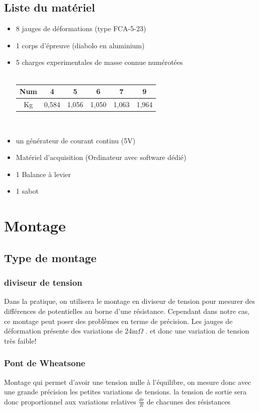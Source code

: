 \documentclass[10pt,a4paper]{report}
\begin{document}
\section{Liste du matériel}
\begin{itemize}
\item 8 jauges de déformations (type FCA-5-23)
\item 1 corps d'épreuve (diabolo en aluminium)
\item 5 charges experimentales de masse connue numérotées ~\\~\\
\begin{tabular}{|c|c|c|c|c|c|}
\hline 
Num & 4 & 5 & 6 & 7 & 9 \\ \hline
Kg    & 0,584 & 1,056 & 1,050 & 1,063 & 1,964 \\ \hline
\end{tabular}~\\
\item un générateur de courant continu (5V)
\item Matériel d'acquisition (Ordinateur avec software dédié)
\item 1 Balance à levier
\item 1 sabot
\end{itemize}
\chapter{Montage}
\section{Type de montage}
\subsection{diviseur de tension}
Dans la pratique, on utilisera le montage en diviseur de tension pour mesurer des différences de potentielles au borne d'une résistance. Cependant dans notre cas, ce montage peut poser des problèmes en terme de précision. Les jauges de déformation présente des variations de 24m$\Omega$ . et donc une variation de tension très faible!
\subsection{Pont de Wheatsone}
Montage qui permet d'avoir une tension nulle à l'équilibre, on mesure donc avec une grande précision les petites variations de tensions. la tension de sortie sera donc proportionnel aux variations relatives $\frac{dr}{R}$ de chacunes des résistances
\end{document}
